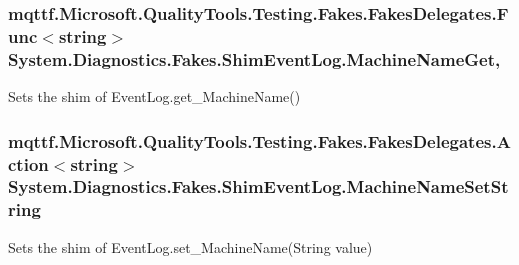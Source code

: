 \hypertarget{class_system_1_1_diagnostics_1_1_fakes_1_1_shim_event_log_a7d7e0b2291a4fb819d46bfd374757897}{
\subsubsection[{Machine\-Name\-Get}]{\setlength{\rightskip}{0pt plus 5cm}mqttf.\-Microsoft.\-Quality\-Tools.\-Testing.\-Fakes.\-Fakes\-Delegates.\-Func$<$string$>$ System.\-Diagnostics.\-Fakes.\-Shim\-Event\-Log.\-Machine\-Name\-Get\hspace{0.3cm}{\ttfamily [get]}, {\ttfamily [set]}}}\label{class_system_1_1_diagnostics_1_1_fakes_1_1_shim_event_log_a7d7e0b2291a4fb819d46bfd374757897}


Sets the shim of Event\-Log.\-get\-\_\-\-Machine\-Name()

\hypertarget{class_system_1_1_diagnostics_1_1_fakes_1_1_shim_event_log_a38f4598cd462be0ac706df2e215b3e41}{
\subsubsection[{Machine\-Name\-Set\-String}]{\setlength{\rightskip}{0pt plus 5cm}mqttf.\-Microsoft.\-Quality\-Tools.\-Testing.\-Fakes.\-Fakes\-Delegates.\-Action$<$string$>$ System.\-Diagnostics.\-Fakes.\-Shim\-Event\-Log.\-Machine\-Name\-Set\-String\hspace{0.3cm}{\ttfamily [set]}}}\label{class_system_1_1_diagnostics_1_1_fakes_1_1_shim_event_log_a38f4598cd462be0ac706df2e215b3e41}


Sets the shim of Event\-Log.\-set\-\_\-\-Machine\-Name(\-String value)

